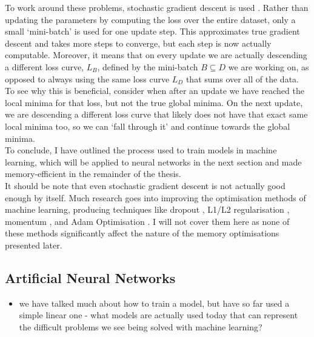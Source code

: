 To work around these problems, stochastic gradient descent is used \cite{Bottou2018}. Rather than updating the parameters by computing the loss over the entire dataset, only a small `mini-batch' is used for one update step. This approximates true gradient descent and takes more steps to converge, but each step is now actually computable. Moreover, it means that on every update we are actually descending a different loss curve, \(L_B\), defined by the mini-batch \(B\subseteq D\) we are working on, as opposed to always using the same loss curve \(L_D\) that sums over all of the data. To see why this is beneficial, consider when after an update we have reached the local minima for that loss, but not the true global minima. On the next update, we are descending a different loss curve that likely does not have that exact same local minima too, so we can ‘fall through it’ and continue towards the global minima. \\

To conclude, I have outlined the process used to train models in machine learning, which will be applied to neural networks in the next section and made memory-efficient in the remainder of the thesis. \\

It should be note that even stochastic gradient descent is not actually good enough by itself. Much research goes into improving the optimisation methods of machine learning, producing techniques like dropout \cite{Srivastava2014}, L1/L2 regularisation \cite{Anders1992-weight-decay, Ng2004}, momentum \cite{Sutskever2013}, and Adam Optimisation \cite{Kingma2015-adam}. I will not cover them here as none of these methods significantly affect the nature of the memory optimisations presented later.

\subsection{Artificial Neural Networks}
\begin{itemize}
    \item we have talked much about how to train a model, but have so far used a simple linear one - what models are actually used today that can represent the difficult problems we see being solved with machine learning?
    
\end{itemize}